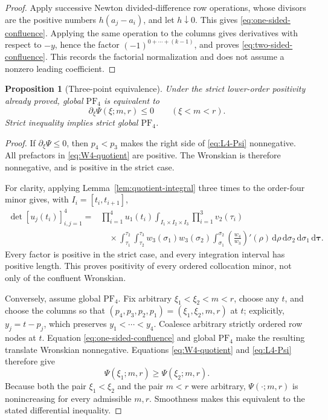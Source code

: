 \documentclass[11pt]{article}
\newtheorem{proposition}[theorem]{Proposition}
\theoremstyle{remark}
\newcommand{\dd}{\,\mathrm{d}}
\newcommand{\PF}{\mathrm{PF}}
\numberwithin{equation}{section}
\begin{document}
\begin{proof}
Apply successive Newton divided-difference row operations, whose divisors
are the positive numbers \(h(a_j-a_i)\), and let \(h\downarrow0\). This gives
\eqref{eq:one-sided-confluence}. Applying the same operation to the columns
gives derivatives with respect to \(-y\), hence the factor
\((-1)^{0+\cdots+(k-1)}\), and proves
\eqref{eq:two-sided-confluence}. This records the factorial normalization and
does not assume a nonzero leading coefficient.
\end{proof}

\begin{proposition}[Three-point equivalence]\label{prop:equivalence}
Under the strict lower-order positivity already proved, global \(\PF_4\) is
equivalent to
\[
 \partial_\xi\Psi(\xi;m,r)\leq0\qquad(\xi<m<r).
\]
Strict inequality implies strict global \(\PF_4\).
\end{proposition}

\begin{proof}
If \(\partial_\xi\Psi\leq0\), then \(p_4<p_3\) makes the right side of
\eqref{eq:L4-Psi} nonnegative. All prefactors in
\eqref{eq:W4-quotient} are positive. The Wronskian is therefore
nonnegative, and is positive in the strict case.

For clarity, applying Lemma~\ref{lem:quotient-integral} three times to the
order-four minor gives, with \(I_i=[t_i,t_{i+1}]\),
\begin{align*}
\det[u_j(t_i)]_{i,j=1}^4
={}&\prod_{i=1}^4u_1(t_i)
\int_{I_1\times I_2\times I_3}\prod_{i=1}^3v_2(\tau_i)\\
&\quad\times\int_{\tau_1}^{\tau_2}\int_{\tau_2}^{\tau_3}
w_3(\sigma_1)w_3(\sigma_2)
\int_{\sigma_1}^{\sigma_2}
\left(\frac{w_4}{w_3}\right)'(\rho)\dd\rho
\dd\sigma_2\dd\sigma_1\dd\boldsymbol\tau.
\end{align*}
Every factor is positive in the strict case, and every integration interval
has positive length. This proves positivity of every ordered collocation minor,
not only of the confluent Wronskian.

Conversely, assume global \(\PF_4\). Fix arbitrary
\(\xi_1<\xi_2<m<r\), choose any \(t\), and choose the columns so that
\((p_4,p_3,p_2,p_1)=(\xi_1,\xi_2,m,r)\) at \(t\); explicitly,
\(y_j=t-p_j\), which preserves \(y_1<\cdots<y_4\). Coalesce arbitrary
strictly ordered row nodes at \(t\). Equation
\eqref{eq:one-sided-confluence} and global \(\PF_4\) make the resulting
translate Wronskian nonnegative. Equations \eqref{eq:W4-quotient} and
\eqref{eq:L4-Psi} therefore give
\[
 \Psi(\xi_1;m,r)\geq\Psi(\xi_2;m,r).
\]
Because both the pair \(\xi_1<\xi_2\) and the pair \(m<r\) were arbitrary,
\(\Psi(\cdot;m,r)\) is nonincreasing for every admissible \(m,r\). Smoothness
makes this equivalent to the stated differential inequality.
\end{proof}
\end{document}
